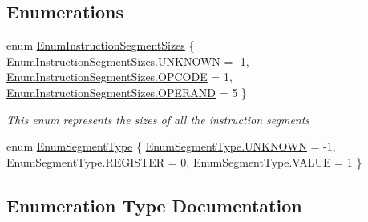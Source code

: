 \subsection*{Enumerations}
\begin{DoxyCompactItemize}
\item 
enum \hyperlink{namespace_c_p_u___o_s___simulator_1_1_compiler_1_1_backend_a366a7efa6fcfb05aa404e76da1cf3c5e}{Enum\+Instruction\+Segment\+Sizes} \{ \hyperlink{namespace_c_p_u___o_s___simulator_1_1_compiler_1_1_backend_a366a7efa6fcfb05aa404e76da1cf3c5ea696b031073e74bf2cb98e5ef201d4aa3}{Enum\+Instruction\+Segment\+Sizes.\+U\+N\+K\+N\+O\+W\+N} = -\/1, 
\hyperlink{namespace_c_p_u___o_s___simulator_1_1_compiler_1_1_backend_a366a7efa6fcfb05aa404e76da1cf3c5ea11bdee9fdefbd8d33a25257557bddbef}{Enum\+Instruction\+Segment\+Sizes.\+O\+P\+C\+O\+D\+E} = 1, 
\hyperlink{namespace_c_p_u___o_s___simulator_1_1_compiler_1_1_backend_a366a7efa6fcfb05aa404e76da1cf3c5ea11f3de9b2b548c31805cf34d512ee177}{Enum\+Instruction\+Segment\+Sizes.\+O\+P\+E\+R\+A\+N\+D} = 5
 \}\begin{DoxyCompactList}\small\item\em This enum represents the sizes of all the instruction segments \end{DoxyCompactList}
\item 
enum \hyperlink{namespace_c_p_u___o_s___simulator_1_1_compiler_1_1_backend_a39bd0e4034345155514db8f136c9c639}{Enum\+Segment\+Type} \{ \hyperlink{namespace_c_p_u___o_s___simulator_1_1_compiler_1_1_backend_a39bd0e4034345155514db8f136c9c639a696b031073e74bf2cb98e5ef201d4aa3}{Enum\+Segment\+Type.\+U\+N\+K\+N\+O\+W\+N} = -\/1, 
\hyperlink{namespace_c_p_u___o_s___simulator_1_1_compiler_1_1_backend_a39bd0e4034345155514db8f136c9c639ad17455cfcb88a53f1603fb817e09c2d6}{Enum\+Segment\+Type.\+R\+E\+G\+I\+S\+T\+E\+R} = 0, 
\hyperlink{namespace_c_p_u___o_s___simulator_1_1_compiler_1_1_backend_a39bd0e4034345155514db8f136c9c639aecc2e9c313faddb07e7da223c1dc5c3f}{Enum\+Segment\+Type.\+V\+A\+L\+U\+E} = 1
 \}
\end{DoxyCompactItemize}


\subsection{Enumeration Type Documentation}
\hypertarget{namespace_c_p_u___o_s___simulator_1_1_compiler_1_1_backend_a366a7efa6fcfb05aa404e76da1cf3c5e}{}
